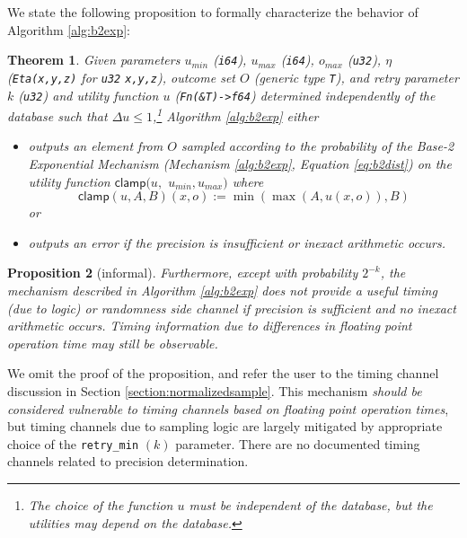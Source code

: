 \documentclass[11pt]{article}
\newtheorem{theorem}{Theorem}[section]
\newtheorem{proposition}[theorem]{Proposition}
\theoremstyle{definition}
\newcommand{\unsigned}[1]{{\tt u#1}}
\newcommand{\signed}[1]{{\tt i#1}}
\begin{document}
We state the following proposition to formally characterize the behavior of Algorithm \ref{alg:b2exp}:

\begin{theorem}\label{thm:exp}
Given parameters $u_{min}$ (\signed{64}), $u_{max}$ (\signed{64}), $o_{max}$ (\unsigned{32}), $\eta$ ({\tt Eta(x,y,z)} for \unsigned{32} {\tt x,y,z}), outcome set $O$ (generic type {\tt T}), and retry parameter $k$ (\unsigned{32}) and utility function $u$ ({\tt Fn(\&T)->f64}) determined independently of the database such that $\Delta u \leq 1$,\footnote{The choice of the function $u$ must be independent of the database, but the utilities may depend on the database.} Algorithm \ref{alg:b2exp}
either 
\begin{itemize}
    \item[(1)] outputs an element from $O$ sampled according to the probability of the Base-2 Exponential Mechanism (Mechanism \ref{alg:b2exp}, Equation \ref{eq:b2dist}) on the utility function $\mathsf{clamp}(u,$ $u_{min},u_{max})$ where  $$\mathsf{clamp}(u,A,B)(x,o):=  \min(\max(A,u(x,o)), B)$$ or 
    \item[(2)] outputs an error if the precision is insufficient or inexact arithmetic occurs. 
\end{itemize}

\end{theorem}


\begin{proposition} [informal]
Furthermore, except with probability $2^{-k}$, the mechanism described in Algorithm \ref{alg:b2exp} does not provide a useful timing (due to logic) or randomness side channel if precision is sufficient and no inexact arithmetic occurs. Timing information due to differences in floating point operation time may still be observable.
\end{proposition}

We omit the proof of the proposition, and refer the user to the timing channel discussion in Section \ref{section:normalizedsample}. This mechanism \textit{should be considered vulnerable to timing channels based on floating point operation times}, but timing channels due to sampling logic are largely mitigated by appropriate choice of the {\tt retry\_min} $(k)$ parameter. There are no documented timing channels related to precision determination.
\end{document}
